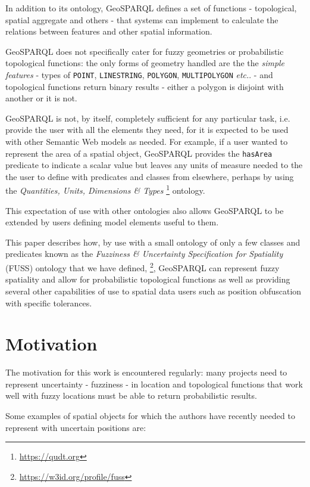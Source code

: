 \documentclass[runningheads]{llncs}
\begin{document}
In addition to its ontology, GeoSPARQL defines a set of functions - topological, spatial aggregate and others - that systems can implement to calculate the relations between features and other spatial information.

GeoSPARQL does not specifically cater for fuzzy geometries or probabilistic topological functions: the only forms of geometry handled are the the \textit{simple features} - \cite{herring2011} types of \texttt{POINT}, \texttt{LINESTRING}, \texttt{POLYGON}, \texttt{MULTIPOLYGON} \textit{etc.}. - and topological functions return binary results - either a polygon is disjoint with another or it is not.

GeoSPARQL is not, by itself, completely sufficient for any particular task, i.e. provide the user with all the elements they need, for it is expected to be used with other Semantic Web models as needed. For example, if a user wanted to represent the area of a spatial object, GeoSPARQL provides the \texttt{hasArea} predicate to indicate a scalar value but leaves any units of measure needed to the the user to define with predicates and classes from elsewhere, perhaps by using the \textit{Quantities, Units, Dimensions \& Types} \footnote{\url{https://qudt.org}} ontology.

This expectation of use with other ontologies also allows GeoSPARQL to be extended by users defining model elements useful to them.

This paper describes how, by use with a small ontology of only a few classes and predicates known as the \textit{Fuzziness \& Uncertainty Specification for Spatiality} (FUSS) ontology that we have defined, \footnote{\url{https://w3id.org/profile/fuss}}, GeoSPARQL can represent fuzzy spatiality and allow for probabilistic topological functions as well as providing several other capabilities of use to spatial data users such as position obfuscation with specific tolerances.


\section{Motivation}\label{sec:motivation}

The motivation for this work is encountered regularly: many projects need to represent uncertainty - fuzziness - in location and topological functions that work well with fuzzy locations must be able to return probabilistic results.

Some examples of spatial objects for which the authors have recently needed to represent with uncertain positions are:
\end{document}
